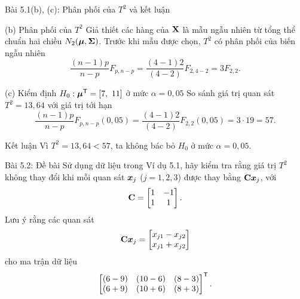 \begin{frame}{Bài 5.1(b), (c): Phân phối của \(T^2\) và kết luận}
   \footnotesize
  \vspace{-0.1cm}
  \begin{block}{(b) Phân phối của \(T^2\)}
    Giả thiết các hàng của \(\mathbf{X}\) là mẫu ngẫu nhiên từ tổng thể chuẩn hai chiều \(N_2(\boldsymbol{\mu},\boldsymbol{\Sigma})\). Trước khi mẫu được chọn, \(T^2\) có phân phối của biến ngẫu nhiên
    \[
      \frac{(n-1)p}{n-p}F_{p,n-p}=\frac{(4-1)2}{(4-2)}F_{2,4-2}=3F_{2,2}.
    \]
  \end{block}

  \begin{block}{(c) Kiểm định \(H_0:\boldsymbol{\mu}^{\mathsf T}=[7,\ 11]\) ở mức \(\alpha=0{,}05\)}
    So sánh giá trị quan sát \(T^2=13{,}64\) với giá trị tới hạn
    \[
      \frac{(n-1)p}{n-p}F_{p,n-p}(0{,}05)=\frac{(4-1)2}{(4-2)}F_{2,2}(0{,}05)=3\cdot 19=57.
    \]
  \end{block}

  \begin{alertblock}{Kết luận}
  Vì \(T^2=13{,}64<57\), ta không bác bỏ \(H_0\) ở mức \(\alpha=0{,}05\).
\end{alertblock}
 
\end{frame}
 
\begin{frame}{Bài 5.2: Đề bài}
  \vspace{0.1cm}
    Sử dụng dữ liệu trong Ví dụ 5.1, hãy kiểm tra rằng giá trị \(T^2\) không thay đổi khi mỗi quan sát \(\boldsymbol{x}_j\) (\(j=1,2,3\)) được thay bằng \(\mathbf{C}\boldsymbol{x}_j\), với
    \[
      \mathbf{C}=
      \begin{bmatrix}
        1 & -1\\
        1 & 1
      \end{bmatrix}.
    \]
    Lưu ý rằng các quan sát
    \[
      \mathbf{C}\boldsymbol{x}_j=
      \begin{bmatrix}
        x_{j1}-x_{j2}\\
        x_{j1}+x_{j2}
      \end{bmatrix}
    \]
    cho ma trận dữ liệu
    \[
      \begin{bmatrix}
        (6-9) & (10-6) & (8-3)\\
        (6+9) & (10+6) & (8+3)
      \end{bmatrix}^{\mathsf T}.
    \]
\end{frame}
 
